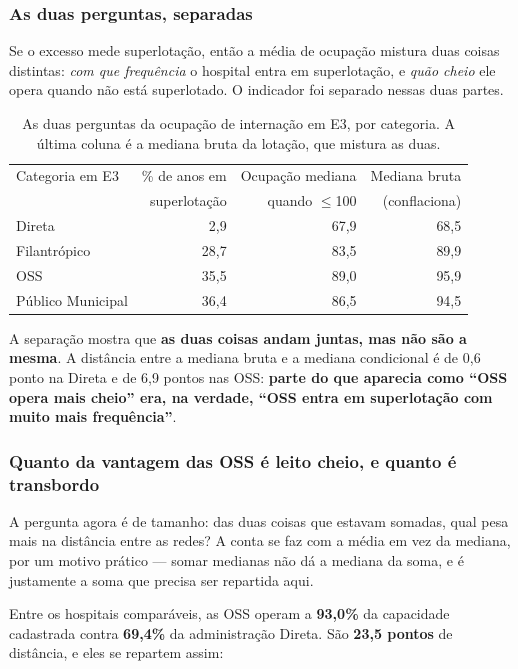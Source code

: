 \subsubsection*{As duas perguntas, separadas}

Se o excesso mede superlotação, então a média de ocupação mistura duas
coisas distintas: \emph{com que frequência} o hospital entra em
superlotação, e \emph{quão cheio} ele opera quando não está superlotado. O
indicador foi separado nessas duas partes.

\begin{table}[H]
\centering
\caption{As duas perguntas da ocupação de internação em E3, por categoria.
A última coluna é a mediana bruta da lotação, que mistura as duas.}
\label{tab:duaspartes}
\small
\begin{tabular}{lrrr}
\toprule
Categoria em E3 & \% de anos em & Ocupação mediana & Mediana bruta \\
                & superlotação  & quando $\leq$100 & (conflaciona) \\
\midrule
Direta            &  2,9 & 67,9 & 68,5 \\
Filantrópico      & 28,7 & 83,5 & 89,9 \\
OSS               & 35,5 & 89,0 & 95,9 \\
Público Municipal & 36,4 & 86,5 & 94,5 \\
\bottomrule
\end{tabular}
\end{table}

A separação mostra que \textbf{as duas coisas andam juntas, mas não são a
mesma}. A distância entre a mediana bruta e a mediana condicional é de 0,6
ponto na Direta e de 6,9 pontos nas OSS: \textbf{parte do que aparecia como
``OSS opera mais cheio'' era, na verdade, ``OSS entra em superlotação com
muito mais frequência''}.

\subsubsection*{Quanto da vantagem das OSS é leito cheio, e quanto é transbordo}

A pergunta agora é de tamanho: das duas coisas que estavam somadas, qual
pesa mais na distância entre as redes? A conta se faz com a média em vez da
mediana, por um motivo prático --- somar medianas não dá a mediana da soma,
e é justamente a soma que precisa ser repartida aqui.

Entre os hospitais comparáveis, as OSS operam a \textbf{93,0\%} da
capacidade cadastrada contra \textbf{69,4\%} da administração Direta. São
\textbf{23,5 pontos} de distância, e eles se repartem assim:

